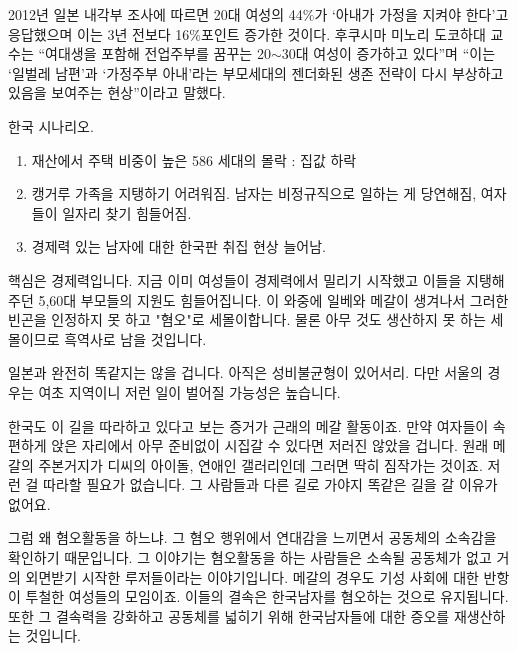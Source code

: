 2012년 일본 내각부 조사에 따르면 20대 여성의 44$\%$가 ‘아내가 가정을 지켜야 한다’고 응답했으며 이는 3년 전보다 16$\%$포인트 증가한 것이다. 후쿠시마 미노리 도코하대 교수는 “여대생을 포함해 전업주부를 꿈꾸는 20$\sim$30대 여성이 증가하고 있다”며 “이는 ‘일벌레 남편’과 ‘가정주부 아내’라는 부모세대의 젠더화된 생존 전략이 다시 부상하고 있음을 보여주는 현상”이라고 말했다.
\vspace{5mm}

한국 시나리오.
\vspace{5mm}
\begin{enumerate}
    \item 재산에서 주택 비중이 높은 586 세대의 몰락 : 집값 하락
    \item 캥거루 가족을 지탱하기 어려워짐. 남자는 비정규직으로 일하는 게 당연해짐, 여자들이 일자리 찾기 힘들어짐.
    \item 경제력 있는 남자에 대한 한국판 취집 현상 늘어남.
\end{enumerate}
\vspace{5mm}

핵심은 경제력입니다.
지금 이미 여성들이 경제력에서 밀리기 시작했고 이들을 지탱해주던 5,60대 부모들의 지원도 힘들어집니다.
이 와중에 일베와 메갈이 생겨나서 그러한 빈곤을 인정하지 못 하고 "혐오"로 세몰이합니다.
물론 아무 것도 생산하지 못 하는 세몰이므로 흑역사로 남을 것입니다.
\vspace{5mm}

일본과 완전히 똑같지는 않을 겁니다. 아직은 성비불균형이 있어서리.
다만 서울의 경우는 여초 지역이니 저런 일이 벌어질 가능성은 높습니다.
\vspace{5mm}

한국도 이 길을 따라하고 있다고 보는 증거가 근래의 메갈 활동이죠.
만약 여자들이 속편하게 앉은 자리에서 아무 준비없이 시집갈 수 있다면 저러진 않았을 겁니다.
원래 메갈의 주본거지가 디씨의 아이돌, 연애인 갤러리인데 그러면 딱히 짐작가는 것이죠.
저런 걸 따라할 필요가 없습니다. 그 사람들과 다른 길로 가야지 똑같은 길을 갈 이유가 없어요.
\vspace{5mm}

그럼 왜 혐오활동을 하느냐. 그 혐오 행위에서 연대감을 느끼면서 공동체의 소속감을 확인하기 때문입니다.
그 이야기는 혐오활동을 하는 사람들은 소속될 공동체가 없고 거의 외면받기 시작한 루저들이라는 이야기입니다.
메갈의 경우도 기성 사회에 대한 반항이 투철한 여성들의 모임이죠. 이들의 결속은 한국남자를 혐오하는 것으로 유지됩니다.
또한 그 결속력을 강화하고 공동체를 넓히기 위해 한국남자들에 대한 증오를 재생산하는 것입니다.
\vspace{5mm}

